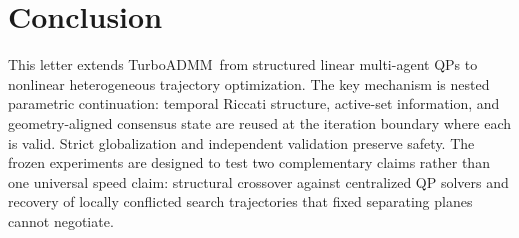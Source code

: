 \documentclass[letterpaper,10pt,conference]{ieeeconf}
\newcommand{\oldmethod}{TurboADMM}
\begin{document}
\section{Conclusion}
\label{sec:conclusion}
This letter extends \oldmethod\ from structured linear multi-agent QPs to
nonlinear heterogeneous trajectory optimization. The key mechanism is nested
parametric continuation: temporal Riccati structure, active-set information,
and geometry-aligned consensus state are reused at the iteration boundary where
each is valid. Strict globalization and independent validation preserve safety.
The frozen experiments are designed to test two complementary claims rather
than one universal speed claim: structural crossover against centralized QP
solvers and recovery of locally conflicted search trajectories that fixed
separating planes cannot negotiate.



\end{document}
